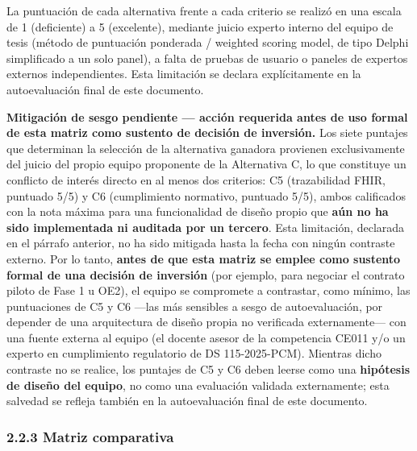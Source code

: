 \documentclass[11pt,a4paper]{article}
\begin{document}
La puntuación de cada alternativa frente a cada criterio se realizó en una escala de 1 (deficiente) a 5 (excelente), mediante juicio experto interno del equipo de tesis (método de puntuación ponderada / weighted scoring model, de tipo Delphi simplificado a un solo panel), a falta de pruebas de usuario o paneles de expertos externos independientes. Esta limitación se declara explícitamente en la autoevaluación final de este documento.

\textbf{Mitigación de sesgo pendiente --- acción requerida antes de uso formal de esta matriz como sustento de decisión de inversión.} Los siete puntajes que determinan la selección de la alternativa ganadora provienen exclusivamente del juicio del propio equipo proponente de la Alternativa C, lo que constituye un conflicto de interés directo en al menos dos criterios: C5 (trazabilidad FHIR, puntuado 5/5) y C6 (cumplimiento normativo, puntuado 5/5), ambos calificados con la nota máxima para una funcionalidad de diseño propio que \textbf{aún no ha sido implementada ni auditada por un tercero}. Esta limitación, declarada en el párrafo anterior, no ha sido mitigada hasta la fecha con ningún contraste externo. Por lo tanto, \textbf{antes de que esta matriz se emplee como sustento formal de una decisión de inversión} (por ejemplo, para negociar el contrato piloto de Fase 1 u OE2), el equipo se compromete a contrastar, como mínimo, las puntuaciones de C5 y C6 ---las más sensibles a sesgo de autoevaluación, por depender de una arquitectura de diseño propia no verificada externamente--- con una fuente externa al equipo (el docente asesor de la competencia CE011 y/o un experto en cumplimiento regulatorio de DS 115-2025-PCM). Mientras dicho contraste no se realice, los puntajes de C5 y C6 deben leerse como una \textbf{hipótesis de diseño del equipo}, no como una evaluación validada externamente; esta salvedad se refleja también en la autoevaluación final de este documento.

\subsubsection{2.2.3 Matriz comparativa}\label{matriz-comparativa}
\end{document}
